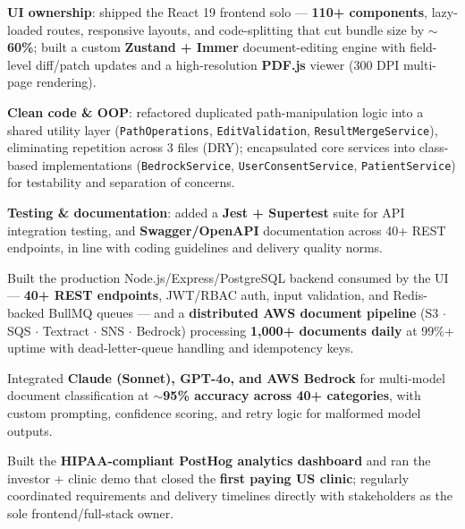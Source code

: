 \documentclass[a4paper,10pt]{article}
\begin{document}
\vspace{2pt}
\begin{itemize}[leftmargin=0.15in, itemsep=1pt]
    \small{\item
    \textbf{UI ownership}: shipped the React 19 frontend solo --- \textbf{110+ components}, lazy-loaded routes, responsive layouts, and code-splitting that cut bundle size by $\sim$\textbf{60\%}; built a custom \textbf{Zustand + Immer} document-editing engine with field-level diff/patch updates and a high-resolution \textbf{PDF.js} viewer (300 DPI multi-page rendering).
    }

    \small{\item
    \textbf{Clean code \& OOP}: refactored duplicated path-manipulation logic into a shared utility layer (\texttt{PathOperations}, \texttt{EditValidation}, \texttt{ResultMergeService}), eliminating repetition across 3 files (DRY); encapsulated core services into class-based implementations (\texttt{BedrockService}, \texttt{UserConsentService}, \texttt{PatientService}) for testability and separation of concerns.
    }

    \small{\item
    \textbf{Testing \& documentation}: added a \textbf{Jest + Supertest} suite for API integration testing, and \textbf{Swagger/OpenAPI} documentation across 40+ REST endpoints, in line with coding guidelines and delivery quality norms.
    }

    \small{\item
    Built the production Node.js/Express/PostgreSQL backend consumed by the UI --- \textbf{40+ REST endpoints}, JWT/RBAC auth, input validation, and Redis-backed BullMQ queues --- and a \textbf{distributed AWS document pipeline} (S3 $\cdot$ SQS $\cdot$ Textract $\cdot$ SNS $\cdot$ Bedrock) processing \textbf{1,000+ documents daily} at 99\%+ uptime with dead-letter-queue handling and idempotency keys.
    }

    \small{\item
    Integrated \textbf{Claude (Sonnet), GPT-4o, and AWS Bedrock} for multi-model document classification at \textbf{$\sim$95\% accuracy across 40+ categories}, with custom prompting, confidence scoring, and retry logic for malformed model outputs.
    }

    \small{\item
    Built the \textbf{HIPAA-compliant PostHog analytics dashboard} and ran the investor + clinic demo that closed the \textbf{first paying US clinic}; regularly coordinated requirements and delivery timelines directly with stakeholders as the sole frontend/full-stack owner.
    }
\end{itemize}
\end{document}
